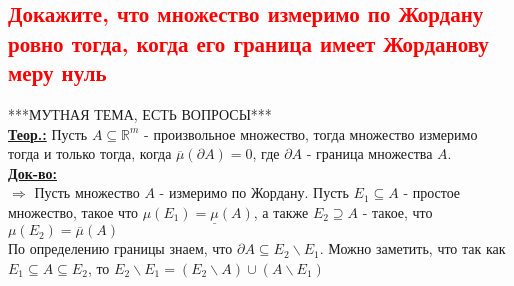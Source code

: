 
\textcolor{red}{\subsection{Докажите, что множество измеримо по Жордану ровно тогда, когда его граница имеет Жорданову меру нуль}}

***МУТНАЯ ТЕМА, ЕСТЬ ВОПРОСЫ***\\
\textbf{\underline{Теор.:} } Пусть $A \subseteq \mathbb{R}^m$ - произвольное множество, тогда 
множество измеримо тогда и только тогда, когда $\overline{\mu}(\partial A) = 0$, где $\partial A$ - граница множества $A$. \\
\textbf{\underline{Док-во:} } \\
$\Rightarrow$ Пусть множество $A$ - измеримо по Жордану. Пусть $E_1 \subseteq A$ - простое множество, такое что $\mu(E_1) = \underline{\mu}(A)$, а также $E_2 \supseteq A$ - такое, что $\mu(E_2) = \overline{\mu}(A)$ \\
По определению границы знаем, что $\partial A \subseteq E_2 \backslash E_1$. Можно заметить, что так как $E_1 \subseteq A \subseteq E_2$, то $E_2 \backslash E_1 = (E_2 \backslash A) \cup (A \backslash E_1)$


